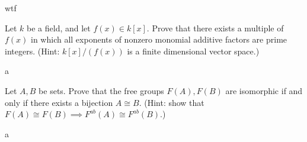 \documentclass[11pt]{report}
\begin{document}
\begin{solution}
	wtf
\end{solution}
\begin{exercise}
	Let $k$ be a field, and let $f(x)\in k[x]$. Prove that there exists a multiple of $f\left( x \right) $ in which all exponents of nonzero monomial additive factors are prime integers. (Hint: $k[x]/(f(x))$ is a finite dimensional vector space.)
\end{exercise}
\begin{solution}
	a
\end{solution}
\begin{exercise}
	Let $A,B$ be sets. Prove that the free groups $F(A),F(B)$ are isomorphic if and only if there exists a bijection $A\cong B$. (Hint: show that $F(A)\cong F(B)\implies F^{ab} (A)\cong F^{ab} (B)$.)
\end{exercise}
\begin{solution}
	a
\end{solution}
\end{document}

